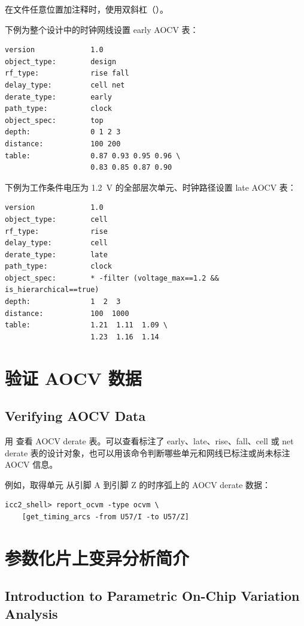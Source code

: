 在文件任意位置加注释时，使用双斜杠（\cmd{//}）。

下例为整个设计中的时钟网线设置 early AOCV 表：
\begin{lstlisting}
version             1.0
object_type:        design
rf_type:            rise fall
delay_type:         cell net
derate_type:        early
path_type:          clock
object_spec:        top
depth:              0 1 2 3
distance:           100 200
table:              0.87 0.93 0.95 0.96 \
                    0.83 0.85 0.87 0.90
\end{lstlisting}

下例为工作条件电压为 1.2~V 的全部层次单元、时钟路径设置 late AOCV 表：
\begin{lstlisting}
version             1.0
object_type:        cell
rf_type:            rise
delay_type:         cell
derate_type:        late
path_type:          clock
object_spec:        * -filter (voltage_max==1.2 && is_hierarchical==true)
depth:              1  2  3
distance:           100  1000
table:              1.21  1.11  1.09 \
                    1.23  1.16  1.14
\end{lstlisting}

\section{验证 AOCV 数据}
\subsection*{Verifying AOCV Data}

用  查看 AOCV derate 表。可以查看标注了 early、late、rise、fall、cell 或 net derate 表的设计对象，也可以用该命令判断哪些单元和网线已标注或尚未标注 AOCV 信息。

例如，取得单元 \cmd{U57} 从引脚 A 到引脚 Z 的时序弧上的 AOCV derate 数据：
\begin{lstlisting}
icc2_shell> report_ocvm -type ocvm \
    [get_timing_arcs -from U57/I -to U57/Z]
\end{lstlisting}

\section{参数化片上变异分析简介}
\subsection*{Introduction to Parametric On-Chip Variation Analysis}

